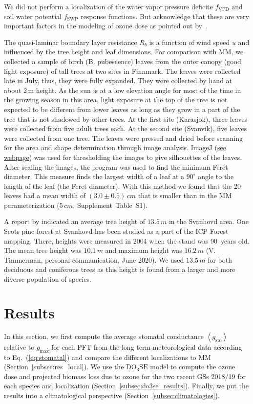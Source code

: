 \documentclass[bg, manuscript]{copernicus}
\begin{document}
We did not perform a localization of the water vapor pressure deficite $f_\mathrm{VPD}$ and soil water potential $f_\mathrm{SWP}$ response functions. But acknowledge that these are very important factors in the modeling of ozone dose as pointed out by~\citet{ACP:Bueker2012}.

The quasi-laminar boundary layer resistance $R_b$ is a function of wind speed $u$ and influenced by the tree height and leaf dimensions. For comparison with MM, we collected a sample of birch (B. pubescence) leaves from the outer canopy (good light exposure) of tall trees at two sites in Finnmark. The leaves were collected late in July, thus, they were fully expanded. They were collected by hand at about $2\,\mathrm{m}$ height. As the sun is at a low elevation angle for most of the time in the growing season in this area, light exposure at the top of the tree is not expected to be different from lower leaves as long as they grow in a part of the tree that is not shadowed by other trees. At the first site (Karasjok), three leaves were collected from five adult trees each. At the second site (Svanvik), five leaves were collected from one tree. The leaves were pressed and dried before scanning for the area and shape determination through image analysis. ImageJ (\href{https://imagej.nih.gov/ij/}{see webpage}) was used for thresholding the images to give silhouettes of the leaves. After scaling the images, the program was used to find the minimum Feret diameter. This measure finds the largest width of a leaf at a $90^\circ$ angle to the length of the leaf (the Feret diameter). With this method we found that the 20 leaves had a mean width of $(3.0\pm 0.5)\,\unit{cm}$ that is smaller than in the MM parameterization ($5\,\unit{cm}$, Supplement~Table~S1). 

A report by \citet[][p.~52]{NINA2004} indicated an average tree height of $13.5\,\unit{m}$ in the Svanhovd area. One Scots pine forest at Svanhovd has been studied as a part of the ICP Forest mapping. There, heights were measured in 2004 when the stand was 90~years old. The mean tree height was $10.1\,\unit{m}$ and maximum height was $16.2\,\unit{m}$ (V. Timmerman, personal communication, June 2020). We used $13.5\,\unit{m}$ for both deciduous and coniferous trees as this height is found from a larger and more diverse population of species.

\section{Results}
\label{sec:results}
In this section, we first compute the average stomatal conductance $\left<g_\mathrm{sto}\right>$ relative to $g_\mathrm{max}$ for each PFT from the long term meteorological data according to Eq.~(\ref{eq:stomatal}) and compare the different localizations to MM (Section~\ref{subsec:res_local}). We use the $\mathrm{DO_3SE}$ model to compute the ozone dose and projected biomass loss due to ozone for the two recent GSs 2018/19 for each species and localization (Section~\ref{subsec:do3se_results}). Finally, we put the results into a climatological perspective (Section~\ref{subsec:climatologies}).  
\end{document}
